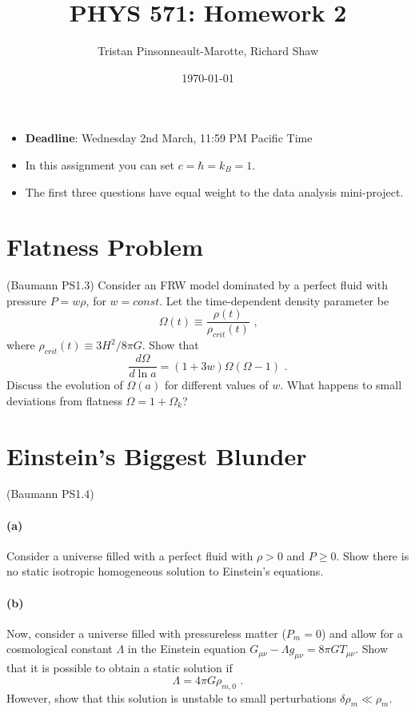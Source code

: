 \documentclass[12pt]{article}
\author{Tristan Pinsonneault-Marotte, Richard Shaw}
\title{PHYS 571: Homework 2}
\date{\today}
\begin{document}
\maketitle

\begin{itemize}
    \item \textbf{Deadline}: Wednesday 2nd March, 11:59 PM Pacific Time
    \item In this assignment you can set $c = \hbar = k_B = 1$.
    \item The first three questions have equal weight to the data analysis mini-project.
\end{itemize}




\section{Flatness Problem}

(Baumann PS1.3) Consider an FRW model dominated by a perfect fluid with pressure
$P = w\rho$, for $w = const$. Let the time-dependent density parameter be
\begin{equation}
    \Omega(t) \equiv \frac{\rho(t)}{\rho_{crit}(t)} \text{ ,}
\end{equation}
where $\rho_{crit}(t) \equiv 3 H^2 / 8 \pi G$. Show that
\begin{equation}
    \frac{d \Omega}{d \ln a} = \left(1 +  3w\right) \Omega
    \left(\Omega - 1\right) \text{ .}
\end{equation}
Discuss the evolution of $\Omega(a)$ for different values of $w$. What happens
to small deviations from flatness $\Omega = 1 + \Omega_k$?


\section{Einstein's Biggest Blunder}

(Baumann PS1.4)

\paragraph{(a)} Consider a universe filled with a perfect fluid with $\rho > 0$
and $P \geq 0$. Show there is no static isotropic homogeneous solution to
Einstein's equations.

\paragraph{(b)} Now, consider a universe filled with pressureless matter ($P_m =
0$) and allow for a cosmological constant $\Lambda$ in the Einstein equation
$G_{\mu\nu} - \Lambda g_{\mu\nu} = 8\pi G T_{\mu\nu}$. Show that it is possible to obtain a static solution if
\begin{equation}
    \Lambda = 4 \pi G \rho_{m,0} \text{ .}
\end{equation}
However, show that this solution is unstable to small perturbations $\delta
\rho_m \ll \rho_m$.
\end{document}
